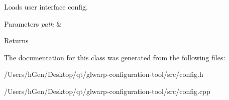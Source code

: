 Loads user interface config. 


\begin{DoxyParams}{Parameters}
{\em path} & \\
\hline
\end{DoxyParams}
\begin{DoxyReturn}{Returns}

\end{DoxyReturn}


The documentation for this class was generated from the following files\+:\begin{DoxyCompactItemize}
\item 
/\+Users/h\+Gen/\+Desktop/qt/glwarp-\/configuration-\/tool/src/config.\+h\item 
/\+Users/h\+Gen/\+Desktop/qt/glwarp-\/configuration-\/tool/src/config.\+cpp\end{DoxyCompactItemize}
